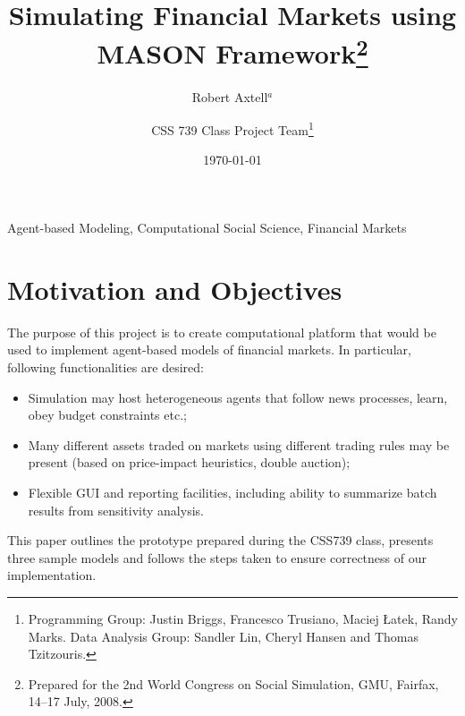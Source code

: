 \documentclass[runningheads]{llncs}
\newcommand{\keywords}[1]{\par\addvspace\baselineskip
\noindent\keywordname\enspace\ignorespaces#1}
\begin{document}
\mainmatter

\title{Simulating Financial Markets using MASON Framework\thanks{Prepared for the 2nd World Congress on Social Simulation, GMU, Fairfax, 14--17 July, 2008.}}


\author{Robert Axtell$^{a}$ \and CSS 739 Class Project Team\thanks{Programming Group: Justin Briggs, Francesco Trusiano, Maciej \L atek, Randy Marks. Data Analysis Group: Sandler Lin, Cheryl Hansen and Thomas Tzitzouris.}}





\date{\today}
\maketitle

\keywords{Agent-based Modeling, Computational Social Science, Financial Markets}

\section{Motivation and Objectives}

The purpose of this project is to create computational platform that would be used to implement agent-based models of financial markets. In particular, following functionalities are desired:

\begin{itemize}
	\item Simulation may host heterogeneous agents that follow news processes, learn, obey budget constraints etc.;
	\item Many different assets traded on markets using different trading rules may be present (based on price-impact heuristics, double auction);
	\item Flexible GUI and reporting facilities, including ability to summarize batch results from sensitivity analysis.
\end{itemize}

This paper outlines the prototype prepared during the CSS739 class, presents three sample models and follows the steps taken to ensure correctness of our implementation. 
\end{document}
